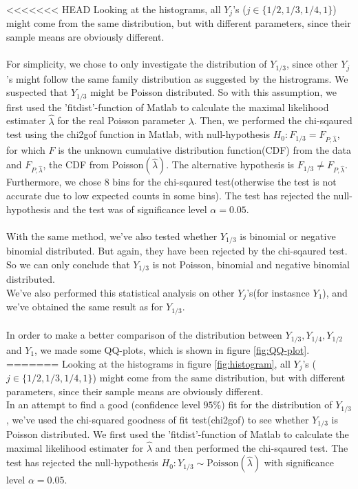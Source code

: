<<<<<<< HEAD
Looking at the histograms, all $Y_j$'s ($j\in \{1/2,1/3,1/4,1\}$) might come from the same distribution, but with different parameters, since their sample means are obviously different.\\
\\
For simplicity, we chose to only investigate the distribution of $Y_{1/3}$, since other $Y_j$'s might follow the same family distribution as suggested by the histrograms. We suspected that $Y_{1/3}$ might be Poisson distributed. So with this assumption, we first used the 'fitdist'-function of Matlab to calculate the maximal likelihood estimater $\hat{\lambda}$ for the real Poisson parameter $\lambda$. Then, we performed the chi-sqaured test using the chi2gof function in Matlab, with null-hypothesis $H_0:F_{1/3}=F_{P,\hat{\lambda}}$, for which $F$ is the unknown cumulative distribution function(CDF) from the data and $F_{P,\hat{\lambda}}$, the CDF from Poisson$(\hat{\lambda})$. The alternative hypothesis is $F_{1/3}\neq F_{P,\hat{\lambda}}$. Furthermore, we chose 8 bins for the chi-sqaured test(otherwise the test is not accurate due to low expected counts in some bins). The test has rejected the null-hypothesis and the test was of significance level $\alpha=0.05$. \\   
\\
With the same method, we've also tested whether $Y_{1/3}$ is binomial or negative binomial distributed. But again, they have been rejected by the chi-sqaured test. So we can only conclude that $Y_{1/3}$ is not Poisson, binomial and negative binomial distributed.\\
We've also performed this statistical analysis on other $Y_j$'s(for instasnce $Y_1$), and we've obtained the same result as for $Y_{1/3}$.\\
\\
In order to make a better comparison of the distribution between $Y_{1/3},Y_{1/4},Y_{1/2}$ and $Y_1$, we made some QQ-plots, which is shown in figure \ref{fig:QQ-plot}.\\ 
=======
Looking at the histograms in figure \ref{fig:histogram}, all $Y_j$'s ($j\in \{1/2,1/3,1/4,1\}$) might come from the same distribution, but with different parameters, since their sample means are obviously different.\\
In an attempt to find a good (confidence level $95\%$) fit for the distribution of $Y_{1/3}$, we've used the chi-squared goodness of fit test(chi2gof) to see whether $Y_{1/3}$ is Poisson distributed. 
We first used the 'fitdist'-function of Matlab to calculate the maximal likelihood estimater for $\hat{\lambda}$ and then performed the chi-sqaured test. 
The test has rejected the null-hypothesis $H_0:Y_{1/3}\sim\text{Poisson}(\hat{\lambda})$ with significance level $\alpha=0.05$.\\   

